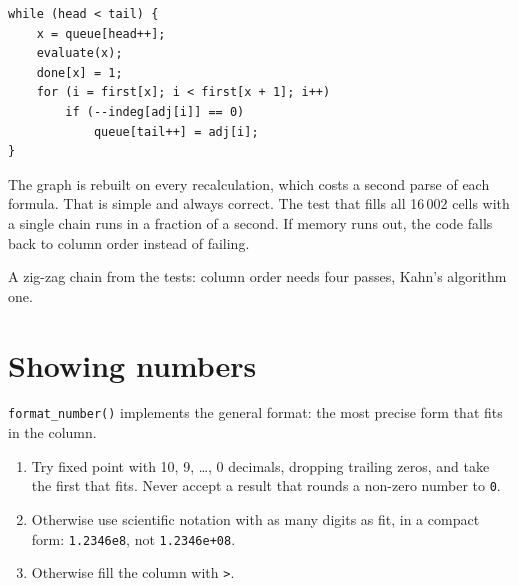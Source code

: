\documentclass[11pt]{article}
\begin{document}
\begin{lstlisting}[style=c]
while (head < tail) {
    x = queue[head++];
    evaluate(x);
    done[x] = 1;
    for (i = first[x]; i < first[x + 1]; i++)
        if (--indeg[adj[i]] == 0)
            queue[tail++] = adj[i];
}
\end{lstlisting}

The graph is rebuilt on every recalculation, which costs a second parse
of each formula. That is simple and always correct. The test that fills
all 16\,002 cells with a single chain runs in a fraction of a second. If
memory runs out, the code falls back to column order instead of failing.

\begin{center}

{\small\sffamily\color{ink}A zig-zag chain from the tests: column order
needs four passes, Kahn's algorithm one.}
\end{center}

\section{Showing numbers}

\texttt{format\_number()} implements the general format: the most precise
form that fits in the column.

\begin{enumerate}[label=\arabic*.]
\item Try fixed point with 10, 9, \dots, 0 decimals, dropping trailing
  zeros, and take the first that fits. Never accept a result that rounds a
  non-zero number to \texttt{0}.
\item Otherwise use scientific notation with as many digits as fit, in a
  compact form: \texttt{1.2346e8}, not \texttt{1.2346e+08}.
\item Otherwise fill the column with \texttt{>}.
\end{enumerate}
\end{document}
